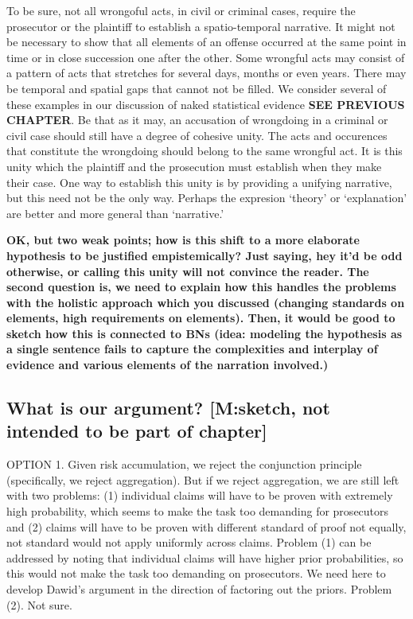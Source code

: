 \documentclass[
  10pt,
  dvipsnames,enabledeprecatedfontcommands]{scrartcl}
\begin{document}
To be sure, not all wrongoful acts, in civil or criminal cases, require
the prosecutor or the plaintiff to establish a spatio-temporal
narrative. It might not be necessary to show that all elements of an
offense occurred at the same point in time or in close succession one
after the other. Some wrongful acts may consist of a pattern of acts
that stretches for several days, months or even years. There may be
temporal and spatial gaps that cannot not be filled. We consider several
of these examples in our discussion of naked statistical evidence
\textbf{SEE PREVIOUS CHAPTER}. Be that as it may, an accusation of
wrongdoing in a criminal or civil case should still have a degree of
cohesive unity. The acts and occurences that constitute the wrongdoing
should belong to the same wrongful act. It is this unity which the
plaintiff and the prosecution must establish when they make their case.
One way to establish this unity is by providing a unifying narrative,
but this need not be the only way. Perhaps the expresion `theory' or
`explanation' are better and more general than `narrative.'



\textbf{OK, but two weak points; how is this shift to a more elaborate hypothesis to be justified empistemically? Just saying, hey it'd be odd otherwise, or calling this unity will not convince the reader. The second question is, we need to explain how this handles the problems with the holistic approach which you discussed (changing standards on elements, high requirements on elements). Then, it would be good to sketch how this is connected to BNs (idea: modeling the hypothesis as a single sentence fails to capture the complexities and interplay of evidence and various elements of the narration involved.)}

\hypertarget{what-is-our-argument-msketch-not-intended-to-be-part-of-chapter}{%
\subsection{What is our argument? {[}M:sketch, not intended to be part
of
chapter{]}}\label{what-is-our-argument-msketch-not-intended-to-be-part-of-chapter}}

OPTION 1. Given risk accumulation, we reject the conjunction principle
(specifically, we reject aggregation). But if we reject aggregation, we
are still left with two problems: (1) individual claims will have to be
proven with extremely high probability, which seems to make the task too
demanding for prosecutors and (2) claims will have to be proven with
different standard of proof not equally, not standard would not apply
uniformly across claims. Problem (1) can be addressed by noting that
individual claims will have higher prior probabilities, so this would
not make the task too demanding on prosecutors. We need here to develop
Dawid's argument in the direction of factoring out the priors. Problem
(2). Not sure.
\end{document}
